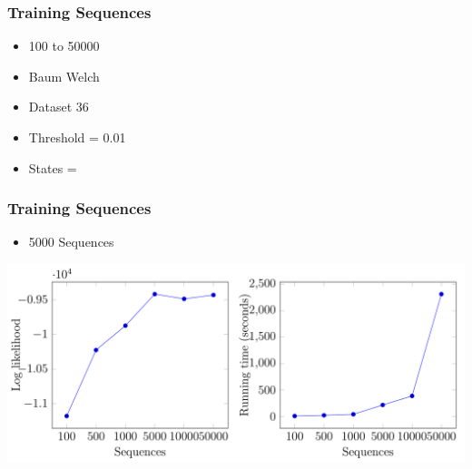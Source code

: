 \begin{frame}
	\frametitle{Training Sequences}
		\begin{itemize}
			\item 100 to 50000
			\item Baum Welch
			\item Dataset 36
			\item Threshold = 0.01
			\item States = 
		\end{itemize}
\end{frame}

\begin{frame}
	\frametitle{Training Sequences}
	\begin{itemize}
		\item 5000 Sequences
	\end{itemize}
	\begin{centering}
		\includegraphics[width=1\textwidth]{images/sequences.png}
	\end{centering}
\end{frame}

